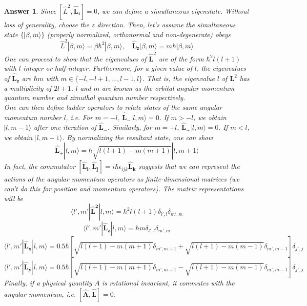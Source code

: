 \documentclass[a4paper]{article}
\newtheorem{ans}{Answer}[subsection]
\theoremstyle{new}
\begin{document}
\begin{ans}
Since $[\hat{L}^2,\mathbf{\hat{L}_i}]=0$, we can define a simultaneous eigenstate. Without loss of generality, choose the $z$ direction. Then, let's assume the simultaneous state $\{|\beta,m\rangle\}$ (properly normalized, orthonormal and non-degenerate) obeys
$$\hat{L}^2|\beta,m\rangle=\beta\hbar^2|\beta,m\rangle,\quad \mathbf{\hat{L}_z}|\beta,m\rangle=m\hbar|\beta,m\rangle$$
One can proceed to show that the eigenvalues of $\mathbf{\hat{L}}^2$ are of the form $\hbar^2l(l+1)$ with $l$ integer or half-integer. Furthermore, for a given value of $l$, the eigenvalues of $\mathbf{\hat{L}_z}$ are $\hbar m$ with $m\in\{-l,-l+1,...,l-1,l\}$. That is, the eigenvalue $l$ of $\mathbf{L}^2$ has a multiplicity of $2l+1$. $l$ and $m$ are known as the orbital angular momentum quantum number and zimuthal quantum number respectively.\\[5pt]
One can then define ladder operators to relate states of the same angular momentum number $l$, i.e. For $m=-l$, $\mathbf{\hat{L}_-}|l,m\rangle=0$. If $m>-l$, we obtain $|l,m-1\rangle$ after one iteration of $\mathbf{\hat{L}_-}$. Similarly, for $m=+l$, $\mathbf{\hat{L}_+}|l,m\rangle=0$. If $m<l$, we obtain $|l,m-1\rangle$. By normalizing the resultant state, one can show 
$$\mathbf{\hat{L}_\pm}|l,m\rangle=\hbar\sqrt{l(l+1)-m(m\pm1)}|l,m\pm1\rangle$$
In fact, the commutator $[\mathbf{\hat{L}_i},\mathbf{\hat{L}_j}]=i\hbar\epsilon_{ijk}\mathbf{\hat{L}_k}$ suggests that we can represent the actions of the angular momentum operators as finite-dimensional matrices (we can't do this for position and momentum operators). The matrix representations will be $$\langle l',m'|\mathbf{\hat{L}^2}|l,m\rangle=\hbar^2l(l+1)\delta_{l',l}\delta_{m',m}$$
$$\langle l',m'|\mathbf{\hat{L}_z}|l,m\rangle=\hbar m\delta_{l',l}\delta_{m',m}$$
$$\langle l',m'|\mathbf{\hat{L}_x}|l,m\rangle=0.5\hbar[\sqrt{l(l+1)-m(m+1)}\delta_{m',m+1}+\sqrt{l(l+1)-m(m-1)}\delta_{m',m-1}]\delta_{j',j}$$
$$\langle l',m'|\mathbf{\hat{L}_y}|l,m\rangle=0.5\hbar[\sqrt{l(l+1)-m(m+1)}\delta_{m',m+1}-\sqrt{l(l+1)-m(m-1)}\delta_{m',m-1}]\delta_{j',j}$$
Finally, if a physical quantity $A$ is rotational invariant, it commutes with the angular momentum, i.e. $[\mathbf{\hat{A}},\mathbf{\hat{L}}]=0$.

\end{ans}
\end{document}
